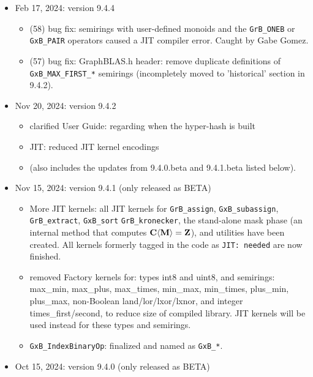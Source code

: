\begin{itemize}
\item Feb 17, 2024: version 9.4.4

    \begin{itemize}
    \item (58) bug fix: semirings with user-defined monoids and the \verb'GrB_ONEB' or
        \verb'GxB_PAIR' operators caused a JIT compiler error.  Caught by Gabe Gomez.
    \item (57) bug fix: GraphBLAS.h header: remove duplicate definitions of
        \verb'GxB_MAX_FIRST_*' semirings (incompletely moved to 'historical' section
        in 9.4.2).
    \end{itemize}

\item Nov 20, 2024: version 9.4.2

    \begin{itemize}
    \item clarified User Guide: regarding when the hyper-hash is built
    \item JIT: reduced JIT kernel encodings
    \item (also includes the updates from 9.4.0.beta and 9.4.1.beta listed below).
    \end{itemize}

\item Nov 15, 2024: version 9.4.1 (only released as BETA)

    \begin{itemize}
    \item More JIT kernels: all JIT kernels for \verb'GrB_assign',
    \verb'GxB_subassign',  \verb'GrB_extract', \verb'GxB_sort'
    \verb'GrB_kronecker', the stand-alone mask phase (an internal method that
    computes $\bf C \langle M \rangle = Z$), and utilities have been created.
    All kernels formerly tagged in the code as \verb'JIT: needed' are now
    finished.
    \item
    removed Factory kernels for: types int8 and uint8, and semirings:
        max\_min, max\_plus, max\_times, min\_max, min\_times, plus\_min,
        plus\_max,
        non-Boolean land/lor/lxor/lxnor, and integer times\_first/second,
        to reduce size of compiled library.
        JIT kernels will be used instead for these types and semirings.
    \item \verb'GxB_IndexBinaryOp': finalized and named as \verb'GxB_*'.
    \end{itemize}

\item Oct 15, 2024: version 9.4.0 (only released as BETA)


\end{itemize}
